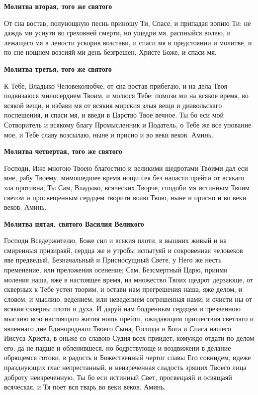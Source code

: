 \medskip
\bfseries  Молитва вторая, того же святого\normalfont{}\nopagebreak


От сна востав, полунощную песнь приношу Ти, Спасе, и припадая вопию Ти: не даждь ми уснути во греховней смерти, но ущедри мя, распныйся волею, и лежащаго мя в лености ускорив возстави, и спаси мя в предстоянии и молитве, и по сне нощнем возсияй ми день безгрешен, Христе Боже, и спаси мя.


\medskip
\bfseries Молитва третья, того же святого\normalfont{}\nopagebreak


К Тебе, Владыко Человеколюбче, от сна востав прибегаю, и на дела Твоя подвизаюся милосердием Твоим, и молюся Тебе: помози ми на всякое время, во всякой вещи, и избави мя от всякия мирския злыя вещи и диавольскаго поспешения, и спаси мя, и введи в Царство Твое вечное. Ты бо еси мой Сотворитель и всякому благу Промысленник и Податель, о Тебе же все упование мое, и Тебе славу возсылаю, ныне и присно и во веки веков. Аминь.


\medskip
\bfseries Молитва четвертая, того же святого\normalfont{}\nopagebreak


Господи, Иже многою Твоею благостию и великими щедротами Твоими дал еси мне, рабу Твоему, мимошедшее время нощи сея без напасти прейти от всякаго зла противна; Ты Сам, Владыко, всяческих Творче, сподоби мя истинным Твоим светом и просвещенным сердцем творити волю Твою, ныне и присно и во веки веков. Аминь.




\medskip
\bfseries Молитва пятая, святого Василия Великого\normalfont{}\nopagebreak


Господи Вседержителю, Боже сил и всякия плоти, в вышних живый и на смиренныя призираяй, сердца же и утробы испытуяй и сокровенная человеков яве предведый, Безначальный и Присносущный Свете, у Него же несть пременение, или преложения осенение; Сам, Безсмертный Царю, приими моления наша, яже в настоящее время, на множество Твоих щедрот дерзающе, от скверных к Тебе устен творим, и остави нам прегрешения наша, яже делом, и словом, и мыслию, ведением, или неведением согрешенная нами; и очисти ны от всякия скверны плоти и духа. И даруй нам бодренным сердцем и трезвенною мыслию всю настоящаго жития нощь прейти, ожидающим пришествия светлаго и явленнаго дне Единороднаго Твоего Сына, Господа и Бога и Спаса нашего Иисуса Христа, в оньже со славою Судия всех приидет, комуждо отдати по делом его; да не падше и обленившеся, но бодрствующе и воздвижени в делание обрящемся готови, в радость и Божественный чертог славы Его совнидем, идеже празднующих глас непрестанный, и неизреченная сладость зрящих Твоего лица доброту неизреченную. Ты бо еси истинный Свет, просвещаяй и освящаяй всяческая, и Тя поет вся тварь во веки веков. Аминь. 


